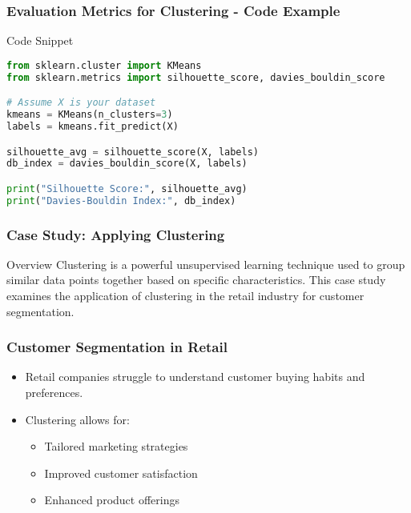 \documentclass[aspectratio=169]{beamer}
\begin{document}
\begin{frame}[fragile]
    \frametitle{Evaluation Metrics for Clustering - Code Example}
    \begin{block}{Code Snippet}
        \begin{lstlisting}[language=Python]
from sklearn.cluster import KMeans
from sklearn.metrics import silhouette_score, davies_bouldin_score

# Assume X is your dataset
kmeans = KMeans(n_clusters=3)
labels = kmeans.fit_predict(X)

silhouette_avg = silhouette_score(X, labels)
db_index = davies_bouldin_score(X, labels)

print("Silhouette Score:", silhouette_avg)
print("Davies-Bouldin Index:", db_index)
        \end{lstlisting}
    \end{block}
\end{frame}

\begin{frame}[fragile]
    \frametitle{Case Study: Applying Clustering}
    \begin{block}{Overview}
        Clustering is a powerful unsupervised learning technique used to group similar data points together based on specific characteristics.
        This case study examines the application of clustering in the retail industry for customer segmentation.
    \end{block}
\end{frame}

\begin{frame}[fragile]
    \frametitle{Customer Segmentation in Retail}
    \begin{itemize}
        \item Retail companies struggle to understand customer buying habits and preferences.
        \item Clustering allows for:
            \begin{itemize}
                \item Tailored marketing strategies
                \item Improved customer satisfaction
                \item Enhanced product offerings
            \end{itemize}
    \end{itemize}
\end{frame}
\end{document}
